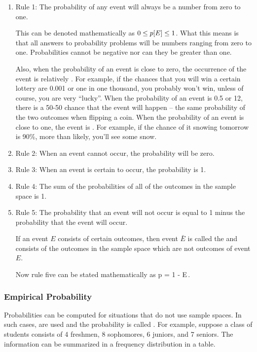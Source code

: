 \begin{enumerate}
\item Rule 1: The probability of any event will always be a number from zero to one.

This can be denoted mathematically as $0\leq p\!\left[{E}\right]\leq 1$. What this means is that all answers to probability problems will be numbers ranging from zero to one. Probabilities cannot be negative nor can they be greater than one.

Also, when the probability of an event is close to zero, the occurrence of the event is relatively . For example, if the chances that you will win a certain lottery are 0.001 or one in one thousand, you probably won't win, unless of course, you are very ``lucky''. When the probability of an event is 0.5 or 12, there is a 50-50 chance that the event will happen -- the same probability of the two outcomes when flipping a coin. When the probability of an event is close to one, the event is . For example, if the chance of it snowing tomorrow is 90\%, more than likely, you'll see some snow.
%
\item Rule 2: When an event cannot occur, the probability will be zero.
%
\item Rule 3: When an event is certain to occur, the probability is 1.
%
\item Rule 4: The sum of the probabilities of all of the outcomes in the sample space is 1.
%
\item Rule 5: The probability that an event will not occur is equal to 1 minus the probability that the event will occur.

If an event $E$ consists of certain outcomes, then event $\bar E$ is called the  and consists of the outcomes in the sample space which are not outcomes of event $E$.

Now rule five can be stated mathematically as
\beq
p = 1 - E\,.
\eeq
\end{enumerate}


\subsubsection{Empirical Probability}
Probabilities can be computed for situations that do not use sample spaces. In such cases,  are used and the probability is called . For example, suppose a class of students consists of 4 freshmen, 8 sophomores, 6 juniors, and 7 seniors. The information can be summarized in a frequency distribution in a table.

